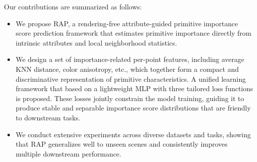 Our contributions are summarized as follows:
\begin{itemize}
    \item We propose RAP, a rendering-free attribute-guided primitive importance score prediction framework that estimates primitive importance directly from intrinsic attributes and local neighborhood statistics.  
    \item We design a set of importance-related per-point features, including average KNN distance, color anisotropy, etc., which together form a compact and discriminative representation of primitive characteristics.  A unified learning framework that based on a lightweight MLP with three tailored loss functions is proposed. These losses jointly constrain the model training, guiding it to produce stable and separable importance score distributions that are friendly to downstream tasks.  
    \item We conduct extensive experiments across diverse datasets and tasks, showing that RAP generalizes well to unseen scenes and consistently improves multiple downstream performance.  
\end{itemize}